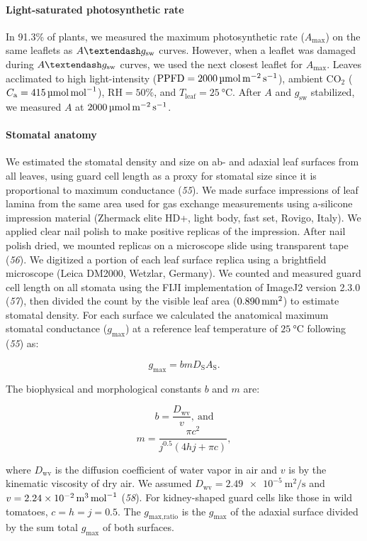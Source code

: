 \documentclass[
  letterpaper,
  DIV=11,
  numbers=noendperiod]{scrartcl}
\let\oldparagraph\paragraph
\renewcommand{\paragraph}[1]{\oldparagraph{#1}\mbox{}}
\newcommand{\agcurve}{$A \textendash g_\text{sw}$}
\newcommand{\caequals}[1]{$C_\mathrm{a} = \qty{#1}{\micro\mol\raiseto{-1}\mol}$}
\newcommand{\gmax}{$g_\text{max}$}
\newcommand{\gmaxratio}{$g_\text{max,ratio}$}
\newcommand{\gsw}{$g_\text{sw}$}
\newcommand{\ppfdequals}[1]{$\mathrm{PPFD} = \qty{#1}{\micro\mol\raiseto{-2}\meter\raiseto{-1}\second}$}
\newcommand{\rhequals}[1]{$\mathrm{RH} = #1\%$}
\newcommand{\tleafequals}[1]{$T_\mathrm{leaf} = \qty{#1}{\degreeCelsius}$}
\begin{document}
\paragraph{Light-saturated photosynthetic
rate}\label{light-saturated-photosynthetic-rate}

In 91.3\% of plants, we measured the maximum photosynthetic rate
(\(A_\mathrm{max}\)) on the same leaflets as \agcurve{} curves. However,
when a leaflet was damaged during \agcurve{} curves, we used the next
closest leaflet for \(A_\mathrm{max}\). Leaves acclimated to high
light-intensity (\ppfdequals{2000}), ambient CO\(_2\) (\caequals{415}),
\rhequals{50}, and \tleafequals{25}. After \(A\) and \gsw{} stabilized,
we measured \(A\) at
\(\qty{2000}{\micro\mol\raiseto{-2}\meter\raiseto{-1}\second}\).

\paragraph{Stomatal anatomy}\label{stomatal-anatomy}

We estimated the stomatal density and size on ab- and adaxial leaf
surfaces from all leaves, using guard cell length as a proxy for
stomatal size since it is proportional to maximum conductance
(\emph{55}). We made surface impressions of leaf lamina from the same
area used for gas exchange measurements using a-silicone impression
material (Zhermack elite HD+, light body, fast set, Rovigo, Italy). We
applied clear nail polish to make positive replicas of the impression.
After nail polish dried, we mounted replicas on a microscope slide using
transparent tape (\emph{56}). We digitized a portion of each leaf
surface replica using a brightfield microscope (Leica DM2000, Wetzlar,
Germany). We counted and measured guard cell length on all stomata using
the FIJI implementation of ImageJ2 version 2.3.0 (\emph{57}), then
divided the count by the visible leaf area
(\(\qty{0.890}{\raiseto{2}\milli\meter}\)) to estimate stomatal density.
For each surface we calculated the anatomical maximum stomatal
conductance (\gmax) at a reference leaf temperature of
\(\qty{25}{\degreeCelsius}\) following (\emph{55}) as:

\[g_\mathrm{max} = b m D_\mathrm{S} A_\mathrm{S}.\]

The biophysical and morphological constants \(b\) and \(m\) are:

\[b = \frac{D_\mathrm{wv}}{v},~\text{and}\]
\[m = \frac{\pi c ^ 2}{j^{0.5} (4 h j + \pi c)},\]

where \(D_\mathrm{wv}\) is the diffusion coefficient of water vapor in
air and \(v\) is by the kinematic viscosity of dry air. We assumed
\(D_\mathrm{wv} = \qty{2.49e-5}{\meter\squared\per\second}\) and
\(v = \qty{2.24e-2}{\raiseto{3}\meter\per\mol}\) (\emph{58}). For
kidney-shaped guard cells like those in wild tomatoes,
\(c = h = j = 0.5\). The \gmaxratio{} is the \gmax{} of the adaxial
surface divided by the sum total \gmax{} of both surfaces.
\end{document}

